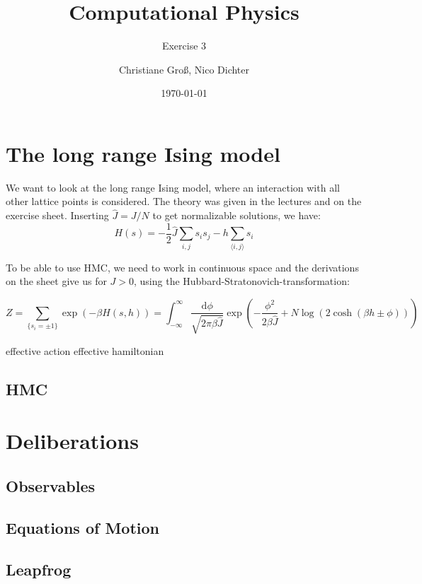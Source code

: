 \documentclass{scrartcl}
\title{Computational Physics}
\subtitle{Exercise 3}
\date{\today}
\author{Christiane Groß, Nico Dichter}
\begin{document}
	\maketitle
\section{The long range Ising model}
We want to look at the long range Ising model, where an interaction with all other lattice points is considered. The theory was given in the lectures and on the exercise sheet. Inserting $\hat{J}=J/N$ to get normalizable solutions, we have: 
\begin{equation}
H(s)=-\frac{1}{2}\hat{J}\sum_{i,j}s_is_j-h\sum_{\langle i,j\rangle }s_i
\label{eq:hamiltonianising}
\end{equation}

To be able to use HMC, we need to work in continuous space and the derivations on the sheet give us for $J>0$, using the Hubbard-Stratonovich-transformation:

\begin{equation}
Z=\sum_{\{s_i=\pm1\}}\exp(-\beta H(s,h))=
\int_{-\infty}^{\infty}\frac{\mathrm{d} \phi}{\sqrt{2\pi\beta\hat{J}}}
\exp\left( -\frac{\phi^2}{2\beta\hat{J}}+N\log\left( 2\cosh(\beta h\pm\phi)\right) \right) 
\label{eq:partfunc}
\end{equation}

effective action 
effective hamiltonian

\subsection{HMC}

\section{Deliberations}
\subsection{Observables}

\subsection{Equations of Motion}

\subsection{Leapfrog}
\end{document}
